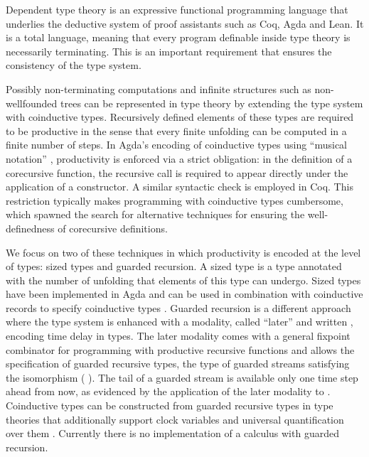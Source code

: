 Dependent type theory is an expressive functional programming
language that underlies the deductive system of proof assistants such
as Coq, Agda and Lean.  It is a total language,
meaning that every program definable inside type theory is necessarily
terminating. This is an important requirement that ensures the
consistency of the type system. 

Possibly non-terminating computations
and infinite structures such as non-wellfounded trees can be
represented in type theory by extending the type system with
coinductive types. Recursively defined elements of these types
are required to be productive \cite{Coquand93} in the sense that every
finite unfolding can be computed in a finite number of steps.
In Agda's encoding of coinductive types using ``musical notation''
\cite{DA10}, productivity is enforced via a strict obligation: in the
definition of a corecursive function, the recursive
call is required to appear directly under
the application of a constructor. A similar syntactic
check is employed in Coq.
This restriction
typically makes programming with coinductive types cumbersome,
which spawned the search for alternative techniques for ensuring the
well-definedness of corecursive definitions.

We focus on two of these techniques in which productivity is encoded
at the level of types: sized types and guarded recursion. A sized type
\cite{Hughes96} is a type annotated with the number of unfolding that
elements of this type can undergo. Sized types have been implemented
in Agda \cite{A-sized,AVW-normalization} and can be used in
combination with coinductive records to specify
coinductive types \cite{Copatterns}.  Guarded recursion \cite{Nakano}
is a different approach where the type system is enhanced with a
modality, called ``later'' and written , encoding time delay in
types. The later modality comes with a general fixpoint combinator for
programming with productive recursive functions and allows the
specification of guarded recursive types, \eg the type of guarded
streams satisfying the isomorphism     
 ( ). The tail of a guarded stream is available only
one time step ahead from now, as evidenced by the application of the
later modality to  . Coinductive types can be constructed
from guarded recursive types in type theories that additionally
support clock variables and universal quantification over them
\cite{atkey2013productive,BahrGM17}. Currently there is no
implementation of a calculus with guarded recursion.

